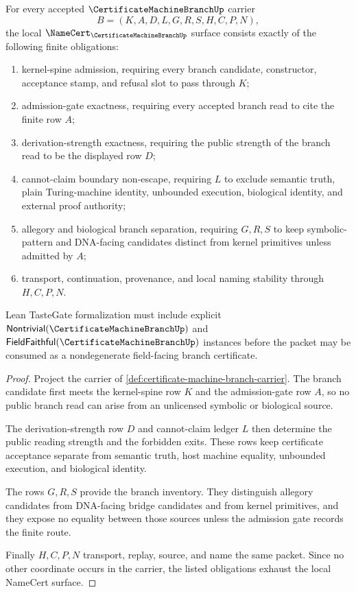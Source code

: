 \begin{theorem}\label{thm:certificate-machine-branch-namecert-obligations}
For every accepted $\CertificateMachineBranchUp$ carrier
$$
B=(K,A,D,L,G,R,S,H,C,P,N),
$$
the local $\NameCert_{\CertificateMachineBranchUp}$ surface consists exactly of the following finite obligations:
\begin{enumerate}
\item kernel-spine admission, requiring every branch candidate, constructor, acceptance stamp, and refusal slot to pass through $K$;
\item admission-gate exactness, requiring every accepted branch read to cite the finite row $A$;
\item derivation-strength exactness, requiring the public strength of the branch read to be the displayed row $D$;
\item cannot-claim boundary non-escape, requiring $L$ to exclude semantic truth, plain Turing-machine identity, unbounded execution, biological identity, and external proof authority;
\item allegory and biological branch separation, requiring $G,R,S$ to keep symbolic-pattern and DNA-facing candidates distinct from kernel primitives unless admitted by $A$;
\item transport, continuation, provenance, and local naming stability through $H,C,P,N$.
\end{enumerate}
Lean TasteGate formalization must include explicit $\mathsf{Nontrivial}(\CertificateMachineBranchUp)$ and $\mathsf{FieldFaithful}(\CertificateMachineBranchUp)$ instances before the packet may be consumed as a nondegenerate field-facing branch certificate.
\end{theorem}
\begin{proof}
Project the carrier of \autoref{def:certificate-machine-branch-carrier}. The branch candidate first meets the kernel-spine row $K$ and the admission-gate row $A$, so no public branch read can arise from an unlicensed symbolic or biological source.

The derivation-strength row $D$ and cannot-claim ledger $L$ then determine the public reading strength and the forbidden exits. These rows keep certificate acceptance separate from semantic truth, host machine equality, unbounded execution, and biological identity.

The rows $G,R,S$ provide the branch inventory. They distinguish allegory candidates from DNA-facing bridge candidates and from kernel primitives, and they expose no equality between those sources unless the admission gate records the finite route.

Finally $H,C,P,N$ transport, replay, source, and name the same packet. Since no other coordinate occurs in the carrier, the listed obligations exhaust the local NameCert surface.
\end{proof}

